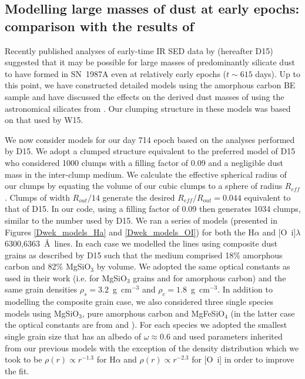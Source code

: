 \documentclass[useAMS,usenatbib,usegraphicx]{mnras}
\begin{document}
\subsection{Modelling large masses of dust at early epochs: comparison with the results of \citet{Dwek2015}}

Recently published analyses of early-time IR SED data by \citet{Dwek2015} (hereafter D15) suggested that it may be possible for large masses of predominantly silicate dust to have formed in SN~1987A even at relatively early epochs ($t\sim615$ days).  Up to this point, we have constructed detailed models using the \citet{Zubko1996} amorphous carbon BE sample and have discussed the effects on the derived dust masses of using the astronomical silicates from \citet{Draine1984}.  Our clumping structure in these models was based on that used by W15.



We now consider models for our day 714 epoch based on the analyses performed by D15.  We adopt a clumped structure equivalent to the preferred model of D15 who considered 1000 clumps with a filling factor of 0.09 and a negligible dust mass in the inter-clump medium.  We calculate the effective spherical radius of our clumps by equating the volume of our cubic clumps to a sphere of radius $R_{eff}$.  Clumps of width $R_{out}/14$ generate the desired $R_{eff}/R_{out}=0.044$ equivalent to that of D15.  In our code, using a filling factor of 0.09 then generates 1034 clumps, similar to the number used by D15.  We ran a series of models (presented in Figures \ref{Dwek_models_Ha} and \ref{Dwek_models_OI}) for both the H$\alpha$ and [O~{\sc i}]$\lambda$6300,6363~\AA\ lines.  In each case we modelled the lines using composite dust grains as described by D15 such that the medium comprised 18\% amorphous carbon and 82\% MgSiO$_3$ by volume.  We adopted the same optical constants as used in their work (i.e. \citet{Jager2003} for MgSiO$_3$ grains and \citet{Zubko1996} for amorphous carbon) and the same grain densities $\rho_s=3.2$~g~cm$^{-3}$ and $\rho_c=1.8$~g~cm$^{-3}$.  In addition to modelling the composite grain case, we also considered three single species models using MgSiO$_3$, pure amorphous carbon and MgFeSiO$_4$ (in the latter case the optical constants are from \citet{Jager1994} and \citet{Dorschner1995}).  For each species we adopted the smallest single grain size that has an albedo of $\omega \approx 0.6$ and used parameters inherited from our previous models with the exception of the density distribution which we took to be $\rho(r) \propto r^{-1.3}$ for H$\alpha$ and $\rho(r) \propto r^{-2.3}$ for [O~{\sc i}] in order to improve the fit.
\end{document}
